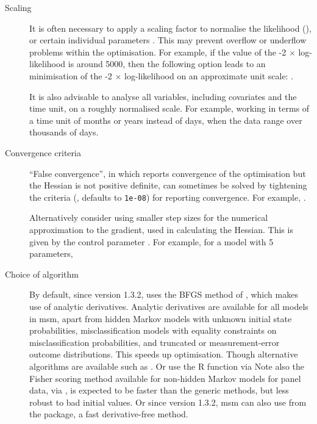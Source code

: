 \begin{description}
\item[Scaling] It is often necessary to apply a scaling factor to normalise the likelihood (), or certain individual parameters .  This may prevent overflow or underflow problems within the optimisation.  For example, if the value of the -2 $\times$ log-likelihood is around 5000, then the following option leads to an minimisation of the -2 $\times$ log-likelihood on an approximate unit scale: .  

  It is also advisable to analyse all variables, including covariates
  and the time unit, on a roughly normalised scale. For example,
  working in terms of a time unit of months or years instead of days,
  when the data range over thousands of days.

\item[Convergence criteria] ``False convergence'', in which
   reports convergence of the optimisation but the
  Hessian is not positive definite, can sometimes be solved by
  tightening the criteria (, defaults to
  \texttt{1e-08}) for reporting convergence. For example,
  .

  Alternatively consider using smaller step sizes for the numerical
  approximation to the gradient, used in calculating the Hessian.
  This is given by the control parameter . For example,
  for a model with 5 parameters, 

\item[Choice of algorithm] By default, since version 1.3.2,
   uses the BFGS method of , which
  makes use of analytic derivatives.  Analytic derivatives are
  available for all models in msm, apart from hidden Markov models
  with unknown initial state probabilities, misclassification models
  with equality constraints on misclassification probabilities, and
  truncated or measurement-error outcome distributions.  This speeds
  up optimisation.  Though alternative algorithms are available such
  as .  Or use the  R function
  via   Note also the
  Fisher scoring method available for non-hidden Markov models for
  panel data, via , is
  expected to be faster than the generic methods, but less robust to
  bad initial values.  Or since version 1.3.2, msm can also use
   from the  package, a fast
  derivative-free method.


\end{description}
